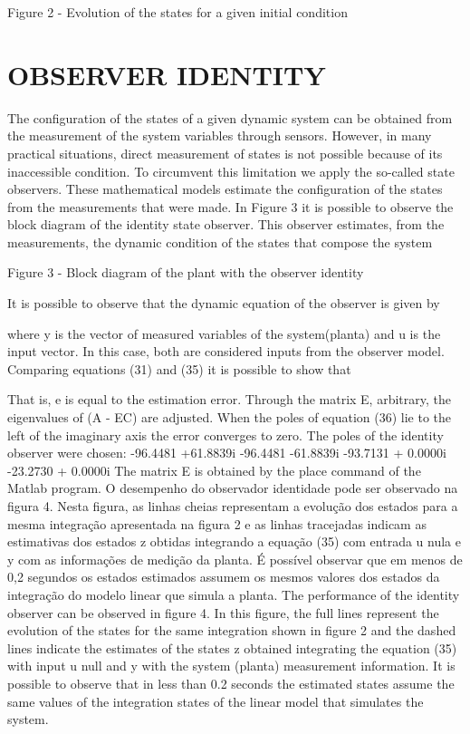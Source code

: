 \documentclass[sublist,a4paper,twoside,11pt]{article}
\begin{document}
Figure 2 - Evolution of the states for a given initial condition

\section{OBSERVER IDENTITY}
The configuration of the states of a given dynamic system can be obtained from the measurement of the system variables through sensors. However, in many practical situations, direct measurement of states is not possible because of its inaccessible condition. To circumvent this limitation we apply the so-called state observers. These mathematical models estimate the configuration of the states from the measurements that were made. In Figure 3 it is possible to observe the block diagram of the identity state observer. This observer estimates, from the measurements, the dynamic condition of the states that compose the system 

Figure 3 - Block diagram of the plant with the observer identity

It is possible to observe that the dynamic equation of the observer is given by

where y is the vector of measured variables of the system(planta) and u is the input vector. In this case, both are considered inputs from the observer model.
Comparing equations (31) and (35) it is possible to show that


That is, e is equal to the estimation error. Through the matrix E, arbitrary, the eigenvalues of (A - EC) are adjusted. When the poles of equation (36) lie to the left of the imaginary axis the error converges to zero. The poles of the identity observer were chosen:
-96.4481 +61.8839i
-96.4481 -61.8839i
-93.7131 + 0.0000i
-23.2730 + 0.0000i
The matrix E is obtained by the place command of the Matlab program.
O desempenho do observador identidade pode ser observado na figura 4. Nesta figura, as linhas cheias representam a evolução dos estados para a mesma integração apresentada na  figura 2 e as linhas tracejadas indicam as estimativas dos estados z obtidas integrando a equação (35) com entrada u nula e y com as informações de medição da planta. É possível observar que em menos de 0,2 segundos os estados estimados assumem os mesmos valores dos estados da integração do modelo linear que simula a planta.	The performance of the identity observer can be observed in figure 4. In this figure, the full lines represent the evolution of the states for the same integration shown in figure 2 and the dashed lines indicate the estimates of the states z obtained integrating the equation (35) with input u null and y with the system (planta) measurement information. It is possible to observe that in less than 0.2 seconds the estimated states assume the same values of the integration states of the linear model that simulates the system.
\end{document}
